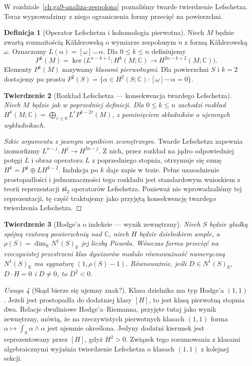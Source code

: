 \documentclass[11pt,a4paper,openany]{report}
\numberwithin{equation}{section}
\theoremstyle{plain}
\newtheorem{twierdzenie}{Twierdzenie}[section]
\theoremstyle{definition}
\newtheorem{definicja}[twierdzenie]{Definicja}
\theoremstyle{remark}
\newtheorem{uwaga}[twierdzenie]{Uwaga}
\newcommand{\R}{\mathbb R}
\newcommand{\C}{\mathbb C}
\begin{document}
W rozdziale~\ref{ch:ga9-analiza-zespolona} poznaliśmy
twarde twierdzenie Lefschetza. Teraz wyprowadzimy z niego
ograniczenia formy przecięć na powierzchni.

\begin{definicja}[Operator Lefschetza i kohomologia pierwotna]
Niech $M$ będzie zwartą rozmaitością Kählerowską
o wymiarze zespolonym $n$ z formą Kählerowską $\omega$.
Oznaczamy $L(\alpha)=[\omega]\smile\alpha$.
Dla $0\le k\le n$ definiujemy
\[
 P^k(M)=\ker\bigl(L^{n-k+1}\colon
 H^k(M;\C)\to H^{2n-k+2}(M;\C)\bigr).
\]
Elementy $P^k(M)$ nazywamy \emph{klasami pierwotnymi}.
Dla powierzchni $S$ i $k=2$ dostajemy po prostu
$P^2(S)=\{\alpha\in H^2(S;\C):[\omega]\smile\alpha=0\}$.
\end{definicja}

\begin{twierdzenie}[Rozkład Lefschetza — konsekwencja twardego Lefschetza]
Niech $M$ będzie jak w poprzedniej definicji.
Dla $0\le k\le n$ zachodzi rozkład
$H^k(M;\C)=\bigoplus_{r\ge0}L^rP^{k-2r}(M)$,
z pominięciem składników o ujemnych wykładnikach.
\end{twierdzenie}
\begin{proof}[Szkic argumentu z jawnym wynikiem zewnętrznym]
Twarde Lefschetza zapewnia izomorfizmy
$L^{n-j}\colon H^j\to H^{2n-j}$.
Z nich, przez rozkład na jądro odpowiedniej potęgi $L$
i obraz operatora $L$ z poprzedniego stopnia,
otrzymuje się sumę $H^k=P^k\oplus LH^{k-2}$.
Indukcja po $k$ daje zapis w tezie. Pełne uzasadnienie
prostopadłości i jednoznaczności tego rozkładu jest
standardowym wnioskiem z teorii reprezentacji $\mathfrak{sl}_2$
operatorów Lefschetza. Ponieważ nie wprowadzaliśmy tej
reprezentacji, tę część traktujemy jako przyjętą
konsekwencję twardego twierdzenia Lefschetza.
\end{proof}

\begin{twierdzenie}[Hodge'a o indeksie — wynik zewnętrzny]
\label{tw:ga10-index}
Niech $S$ będzie gładką spójną rzutową powierzchnią
nad $\C$, niech $H$ będzie dzielnikiem ample, a
$\rho(S)=\dim_{\R}N^1(S)_{\R}$ jej liczbą Picarda.
Wówczas forma przecięć na rzeczywistej przestrzeni klas
dywizorów modulo równoważność numeryczną
$N^1(S)_{\R}$ ma sygnaturę $(1,\rho(S)-1)$.
Równoważnie, jeśli $D\in N^1(S)_{\R}$,
$D\cdot H=0$ i $D\ne0$, to $D^2<0$.
\end{twierdzenie}

\begin{uwaga}[Skąd bierze się ujemny znak?]
Klasa dzielnika ma typ Hodge'a $(1,1)$.
Jeżeli jest prostopadła do dodatniej klasy $[H]$, to jest
klasą pierwotną stopnia dwa. Relacje dwuliniowe
Hodge'a--Riemanna, przyjęte tutaj jako wynik zewnętrzny,
mówią, że na rzeczywistych pierwotnych klasach $(1,1)$
forma $\alpha\mapsto\int_S\alpha\wedge\alpha$ jest ujemnie
określona. Jedyny dodatni kierunek jest reprezentowany
przez $[H]$, gdyż $H^2>0$. Związek tego rozumowania
z klasami algebraicznymi wyjaśnia twierdzenie Lefschetza
o klasach $(1,1)$ z kolejnej sekcji.
\end{uwaga}
\end{document}
